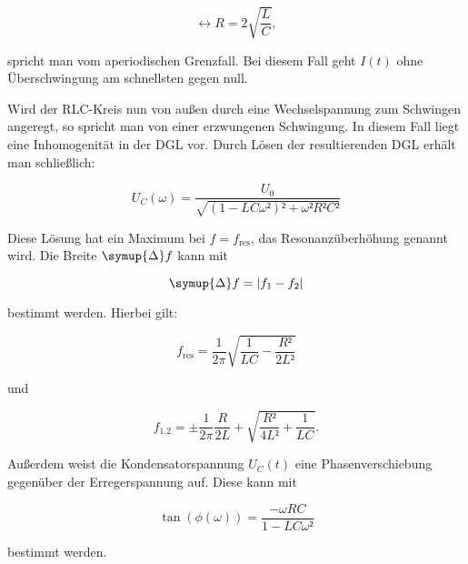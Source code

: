 \begin{equation}
\leftrightarrow R = 2\sqrt{\frac{L}{C}},
\label{eqn:apth}
\end{equation}

spricht man vom aperiodischen Grenzfall. Bei diesem Fall geht $I(t)$ ohne 
Überschwingung am schnellsten gegen null. 

Wird der RLC-Kreis nun von außen durch eine Wechselspannung zum Schwingen 
angeregt, so spricht man von einer erzwungenen Schwingung. In diesem Fall
liegt eine Inhomogenität in der DGL vor. Durch Lösen der resultierenden 
DGL erhält man schließlich: 

\begin{equation}
U_C(\omega) = \frac{U_0}{\sqrt{(1-LC\omega²)²+\omega²R²C²}}
\end{equation}

Diese Lösung hat ein Maximum bei $f = f_\text{res}$, das Resonanzüberhöhung
genannt wird. Die Breite $\symup{\Delta}f$ kann mit

\begin{equation}
\symup{\Delta} f = |f_1 - f_2|
\end{equation}

bestimmt werden. Hierbei gilt: 

\begin{equation}
f_\text{res} = \frac{1}{2\pi}\sqrt{\frac{1}{LC}-\frac{R²}{2L²}}
\end{equation}

und 

\begin{equation}
f_\text{1,2} = \pm \frac{1}{2\pi} \frac{R}{2L}+\sqrt{\frac{R²}{4L²}+\frac{1}{LC}}.
\end{equation}

Außerdem weist die Kondensatorspannung $U_C(t)$ eine Phasenverschiebung gegenüber
der Erregerspannung auf. Diese kann mit 

\begin{equation}
\tan({\phi(\omega)})=\frac{-\omega RC}{1-LC\omega²}
\end{equation}

bestimmt werden. 